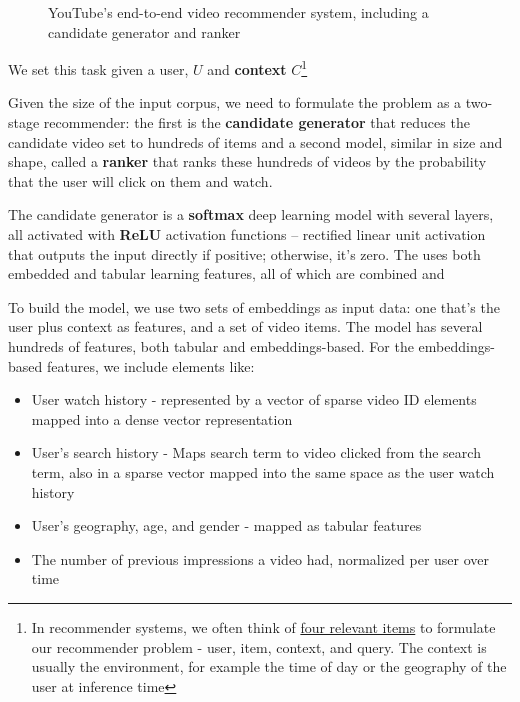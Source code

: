 \documentclass[11pt, table]{diazessay} %
\begin{document}
\begin{sloppypar}
\begin{figure}[H]
\caption{YouTube's end-to-end video recommender system, including a candidate generator and ranker \citep{covington2016deep}}
\end{figure}

We set this task given a user, $U$ and \textbf{context} $C$\footnote{In recommender systems, we often think of \href{https://md.ekstrandom.net/blog/2015/10/search-and-recsys}{four relevant items} to formulate our recommender problem - user, item, context, and query. The context is usually the environment, for example the time of day or the geography of the user at inference time }

Given the size of the input corpus, we need to formulate the problem as a two-stage recommender: the first is the \textbf{candidate generator} that reduces the candidate video set to hundreds of items and a second model, similar in size and shape, called a \textbf{ranker} that ranks these hundreds of videos by the probability that the user will click on them and watch.

The candidate generator is a \textbf{softmax} deep learning model with several layers, all activated with \textbf{ReLU} activation functions --  rectified linear unit activation that outputs the input directly if positive; otherwise, it's zero.  The uses both embedded and tabular learning features, all of which are combined and



To build the model, we use two sets of embeddings as input data: one that's the user plus context as features, and a set of video items. The model has several hundreds of features, both tabular and embeddings-based. For the embeddings-based features, we include elements like:

\begin{itemize}
  \item User watch history - represented by a vector of sparse video ID elements mapped into a dense vector representation
  \item User's search history - Maps search term to video clicked from the search term, also in a sparse vector mapped into the same space as the user watch history
  \item User's geography, age, and gender - mapped as tabular features
  \item The number of previous impressions a video had, normalized per user over time
\end{itemize}



\end{sloppypar}
\end{document}
